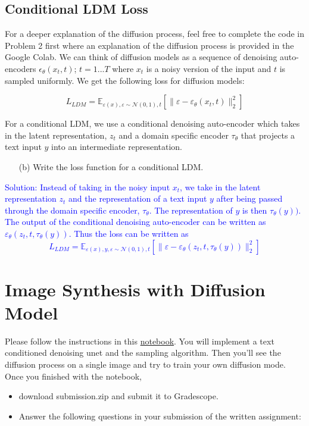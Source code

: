 \documentclass[a4paper]{article}
\begin{document}
\subsection{Conditional LDM Loss}
For a deeper explanation of the diffusion process, feel free to complete the code in Problem 2 first where an explanation of the diffusion process is provided in the Google Colab. We can think of diffusion models as a sequence of denoising auto-encoders \(\epsilon_{\theta}(x_t, t)\); \(t = 1...T\) where \(x_t\) is a noisy version of the input and  \(t\) is sampled uniformly.  We get the following loss for diffusion models:

\[L_{LDM} = \mathbb{E}_{\varepsilon(x), \varepsilon \sim \mathcal{N}(0, 1), t} [\| \varepsilon - \varepsilon_{\theta}(x_t, t) \|_2^2 ] \]

For a conditional LDM, we use a conditional denoising auto-encoder which takes in the latent representation, \(z_t\) and a domain specific encoder \(\tau_{\theta}\) that projects a text input \(y\) into an intermediate representation.  
\begin{itemize}
    \item [(b)]
    Write the loss function for a conditional LDM.
   
\end{itemize}
 \textcolor{blue}{Solution: Instead of taking in the noisy input \(x_t\), we take in the latent representation \(z_t\) and the representation of a text input \(y\) after being passed through the domain specific encoder, \(\tau_{\theta}\). The representation of \(y\) is then \(\tau_{\theta}(y))\).
 The output of the conditional denoising auto-encoder can be written as
 \(\varepsilon_{\theta}(z_t, t, \tau_{\theta}(y))\). Thus the loss can be written as
 \[L_{LDM} = \mathbb{E}_{\varepsilon(x), y, \varepsilon \sim \mathcal{N}(0, 1), t} [\| \varepsilon - \varepsilon_{\theta}(z_t, t, \tau_{\theta}(y)) \|_2^2] \] }


\section{Image Synthesis with Diffusion Model}

Please follow the instructions in this \href{https://colab.research.google.com/drive/1mmyvwlYvAnnfIBIr29bMvOEnL2mUcPHm?usp=sharing}{notebook}. 
You will implement a text conditioned denoising unet and the sampling algorithm. Then you'll see the diffusion process on a single image and try to train your own diffusion mode. Once you finished with the notebook,
\begin{itemize}
    \item download submission.zip and submit it to Gradescope.

    \item Answer the following questions in your submission of the written assignment:
\end{itemize}
\end{document}
